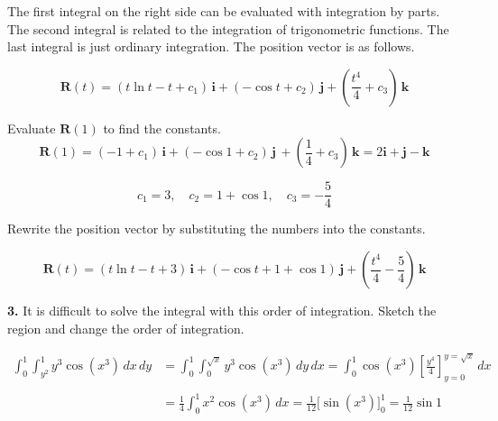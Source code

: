 \documentclass{article}
\begin{document}
The first integral on the right side can be evaluated with integration by parts. The second integral is related to the integration of trigonometric functions. The last integral is just ordinary integration. The position vector is as follows.

\[\mathbf{R}(t)=(t\ln t- t+c_1)\,\mathbf{i}+(-\cos t+c_2)\,\mathbf{j}+\left(\frac{t^4}4+c_3\right)\,\mathbf{k}\]

\newpage

Evaluate $\mathbf{R}(1)$ to find the constants.
\[\mathbf{R}(1)=(-1+c_1)\,\mathbf{i}+(-\cos1+c_2)\,\mathbf{j}\,+\left(\frac14+c_3\right)\,\mathbf{k}=2\mathbf{i}+\mathbf{j}-\mathbf{k}\]

\[c_1=3,\quad c_2=1+\cos1,\quad c_3=-\frac54\]

Rewrite the position vector by substituting the numbers into the constants.

\[\boxed{\mathbf{R}(t)=(t\ln t-t+3)\,\mathbf{i}+(-\cos t + 1 + \cos 1)\,\mathbf{j}+\left(\frac{t^4}4-\frac54\right)\,\mathbf{k}}\]

\vspace{1em}

\textbf{3.} It is difficult to solve the integral with this order of integration. Sketch the region and change the order of integration.

\begin{center}
\end{center}
\begin{align*}
\int_0^1\int_{y^2}^1y^3\cos\left(x^3\right)\,dx\,dy&=\int_0^1\int_0^{\sqrt x}y^3\cos\left(x^3\right)\,dy\,dx=\int_0^1\cos\left(x^3\right)\left[\frac{y^4}4\right]_{y=0}^{y=\sqrt x}\,dx\\\\&=\frac14\int_0^1x^2\cos\left(x^3\right)\,dx=\frac1{12}\bigg[\sin\left(x^3\right)\bigg]_0^1=\boxed{\frac1{12}\sin1}\end{align*}
\end{document}
